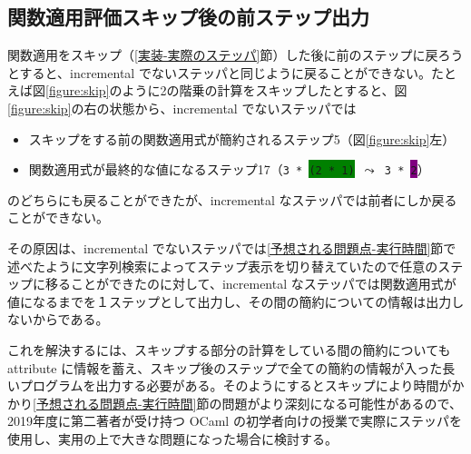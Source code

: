 \subsection{関数適用評価スキップ後の前ステップ出力}

関数適用をスキップ（\ref{実装-実際のステッパ}節）した後に前のステップに戻ろうとすると、incremental でないステッパ\cite{FSA18}と同じように戻ることができない。たとえば図\ref{figure:skip}のように2の階乗の計算をスキップしたとすると、図\ref{figure:skip}の右の状態から、incremental でないステッパでは
\begin{itemize}
\item スキップをする前の関数適用式が簡約されるステップ5（図\ref{figure:skip}左）
\item 関数適用式が最終的な値になるステップ17（\texttt{3 * \colorbox{green}{(2 * 1)} $\leadsto$ 3 * \colorbox{purple}{2}}）
\end{itemize}
のどちらにも戻ることができたが、incremental なステッパでは前者にしか戻ることができない。

その原因は、incremental でないステッパ\cite{FSA18}では\ref{予想される問題点-実行時間}節で述べたように文字列検索によってステップ表示を切り替えていたので任意のステップに移ることができたのに対して、incremental なステッパでは関数適用式が値になるまでを１ステップとして出力し、その間の簡約についての情報は出力しないからである。

これを解決するには、スキップする部分の計算をしている間の簡約についても attribute に情報を蓄え、スキップ後のステップで全ての簡約の情報が入った長いプログラムを出力する必要がある。そのようにするとスキップにより時間がかかり\ref{予想される問題点-実行時間}節の問題がより深刻になる可能性があるので、2019年度に第二著者が受け持つ OCaml の初学者向けの授業で実際にステッパを使用し、実用の上で大きな問題になった場合に検討する。
